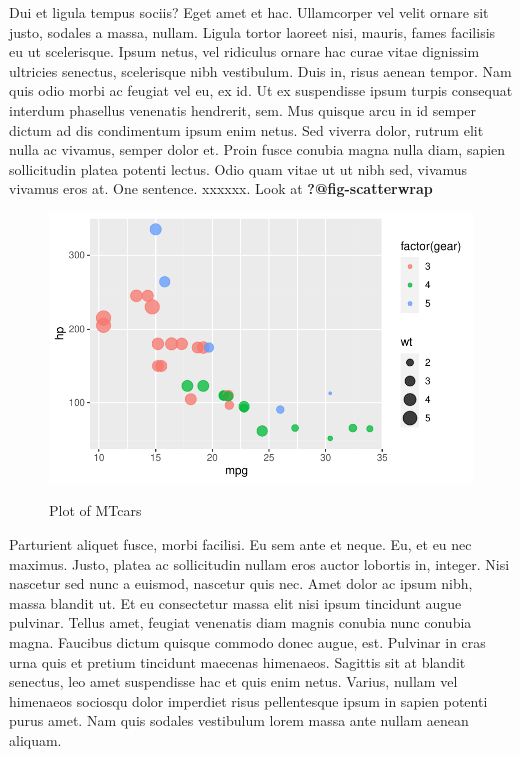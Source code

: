 \documentclass[
  11pt,
  letterpaper,
  DIV=11,
  numbers=noendperiod]{scrartcl}
\begin{document}
Dui et ligula tempus sociis? Eget amet et hac. Ullamcorper vel velit
ornare sit justo, sodales a massa, nullam. Ligula tortor laoreet nisi,
mauris, fames facilisis eu ut scelerisque. Ipsum netus, vel ridiculus
ornare hac curae vitae dignissim ultricies senectus, scelerisque nibh
vestibulum. Duis in, risus aenean tempor. Nam quis odio morbi ac feugiat
vel eu, ex id. Ut ex suspendisse ipsum turpis consequat interdum
phasellus venenatis hendrerit, sem. Mus quisque arcu in id semper dictum
ad dis condimentum ipsum enim netus. Sed viverra dolor, rutrum elit
nulla ac vivamus, semper dolor et. Proin fusce conubia magna nulla diam,
sapien sollicitudin platea potenti lectus. Odio quam vitae ut ut nibh
sed, vivamus vivamus eros at. One sentence. xxxxxx. Look at
\textbf{?@fig-scatterwrap}

\begin{figure}
    {\centering \includegraphics{research-strategy-yt2_files/figure-pdf/fig-scatterwrap-1.pdf}
    }
    \caption{\label{fig-scatterwrap}Plot of MTcars}
    \end{figure}

Parturient aliquet fusce, morbi facilisi. Eu sem ante et neque. Eu, et
eu nec maximus. Justo, platea ac sollicitudin nullam eros auctor
lobortis in, integer. Nisi nascetur sed nunc a euismod, nascetur quis
nec. Amet dolor ac ipsum nibh, massa blandit ut. Et eu consectetur massa
elit nisi ipsum tincidunt augue pulvinar. Tellus amet, feugiat venenatis
diam magnis conubia nunc conubia magna. Faucibus dictum quisque commodo
donec augue, est. Pulvinar in cras urna quis et pretium tincidunt
maecenas himenaeos. Sagittis sit at blandit senectus, leo amet
suspendisse hac et quis enim netus. Varius, nullam vel himenaeos
sociosqu dolor imperdiet risus pellentesque ipsum in sapien potenti
purus amet. Nam quis sodales vestibulum lorem massa ante nullam aenean
aliquam.
\end{document}
